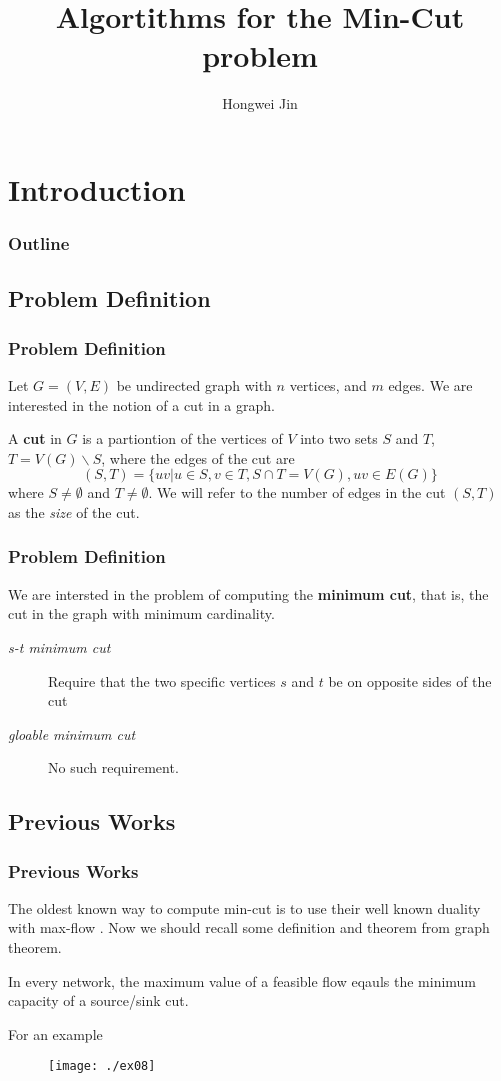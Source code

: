 \documentclass[compress,blue]{beamer}
\title{Algortithms for the Min-Cut problem}
\author{Hongwei Jin}
\institute{Department of Applied Mathematics\\ Illinois Insititute of Technology}
\begin{document}
\frame{
	\titlepage}
\section{Introduction} %

	\begin{frame}
	\frametitle{Outline}
	\tableofcontents
	\end{frame}
	
	\subsection{Problem Definition} %
	
	\begin{frame}[c]
	\frametitle{Problem Definition}
	Let $ G = (V,E) $ be undirected graph with $ n $ vertices, and $ m $ edges. We are interested in the notion of a cut in a graph.
	\begin{definition}
	A \textbf{cut} in $ G $ is a partiontion of the vertices of $ V $ into two sets $ S $ and $ T $, $ T=V(G)\backslash S $, where the edges of the cut are \[ (S,T)=\{ uv|u\in S, v \in T,S\cap T=V(G), uv\in E(G) \} \]
	where $ S \neq \emptyset $ and $  T \neq \emptyset $. We will refer to the number of edges in the cut $ (S,T) $ as the \textit{size} of the cut.
	\end{definition}
	
	\end{frame}
	
	\begin{frame}[c]
	\frametitle{Problem Definition}
	We are intersted in the problem of computing the \textbf{minimum cut}, that is, the cut in the graph with minimum cardinality.
	\begin{description}
	\item [\textit{s-t minimum cut}] Require that the two specific vertices $ s $ and $ t $ be on opposite sides of the cut
	\item [\textit{gloable minimum cut}] No such requirement.
	\end{description}
	\end{frame}
	
	\subsection{Previous Works}
	\begin{frame}[c]
	\frametitle{Previous Works}
	The oldest known way to compute min-cut is to use their well known duality with max-flow . Now we should recall some definition and theorem from graph theorem.
	\begin{theorem} 
	In every network, the maximum value of a feasible flow eqauls the minimum capacity of a source/sink cut.
	\end{theorem}
	For an example
	\begin{figure}[h]
	\centering
	\texttt{[image: ./ex08]}
	\label{fig:ex08}
	\end{figure}
	\end{frame}
\end{document}
